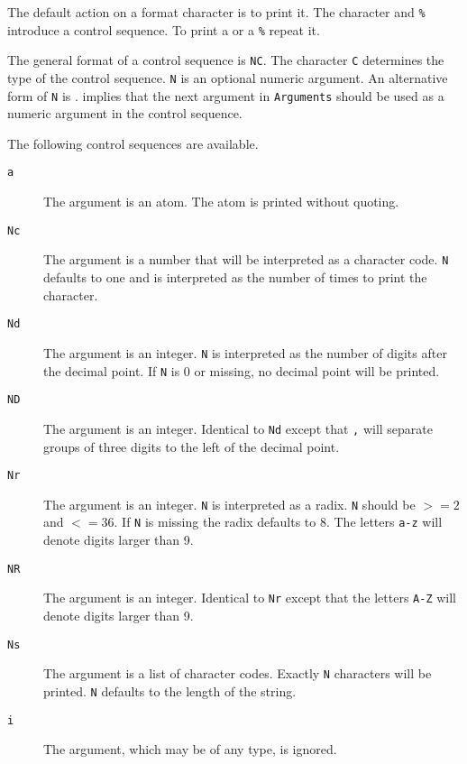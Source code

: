 \begin{description}
	The default action on a format character is to print it.  
	The character \Tild and {\tt \%} introduce a control sequence.  
	To print a \Tild or a {\tt \%} repeat it.

	The general format of a control sequence is {\tt \Tild NC}.  The
	character {\tt C} determines the type of the control sequence.
	{\tt N} is an optional numeric argument.  An alternative form
	of {\tt N} is {\tt *}.  {\tt *} implies that the next argument
	in {\tt Arguments} should be used as a numeric argument in the
	control sequence.

	The following control sequences are available.
	
	\begin{description}

	\item [{\tt \Tild a}]
	The argument is an atom.  The atom is printed without quoting.
	
	\item [{\tt \Tild Nc}]
	 The argument is a number that will be interpreted as
	a character code.  {\tt N} defaults to one and is interpreted as the
	number of times to print the character. 
	
	\item [{\tt \Tild Nd}]
	The argument is an integer.  {\tt N} is interpreted as
	the number of digits after the decimal point.  If {\tt N} is 0 or
	missing, no decimal point will be printed.
	
	\item [{\tt \Tild ND}]
	The argument is an integer.  Identical to {\tt \Tild Nd} except
	that {\tt ,} will separate groups of three 
	digits to the left of the decimal point. 

	\item [{\tt \Tild Nr}]
	The argument is an integer.  {\tt N} is interpreted as a
	radix.  {\tt N} should be $>= 2$ and $<= 36$.  If {\tt N} is
	missing the radix defaults to 8.  The letters {\tt a-z} will
	denote digits larger than 9.
	
	\item [{\tt \Tild NR}]
	The argument is an integer.  Identical to
	{\tt \Tild Nr} except that the letters {\tt A-Z} will denote digits
	larger than 9. 
	
	\item [{\tt \Tild Ns}]
	The argument is a list of character codes.  Exactly {\tt N}
	characters will be printed.  {\tt N} defaults to the length of
	the string. 
	
	\item [{\tt \Tild i}]
	The argument, which may be of any type, is ignored.
	

\end{description}
\end{description}
